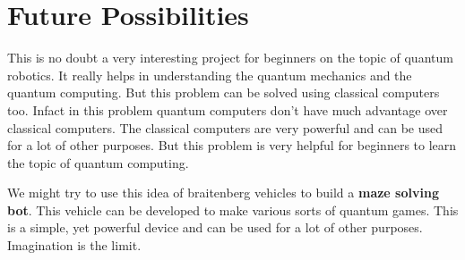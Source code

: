 \section {Future Possibilities}

	This is no doubt a very interesting project for beginners on the topic of quantum robotics. It really helps in understanding the quantum mechanics and the quantum computing. But this problem can be solved using classical computers too. Infact in this problem quantum computers don't have much advantage over classical computers. The classical computers are very powerful and can be used for a lot of other purposes. But this problem is very helpful for beginners to learn the topic of quantum computing.

	We might try to use this idea of braitenberg vehicles to build a \textbf{maze solving bot}. This vehicle can be developed to make various sorts of quantum games. This is a simple, yet powerful device and can be used for a lot of other purposes. Imagination is the limit.